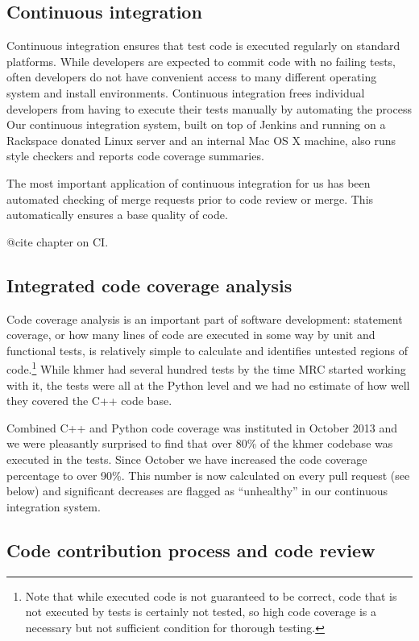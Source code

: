 \documentclass[11pt]{article}
\begin{document}
\subsection{Continuous integration}

Continuous integration ensures that test code is executed regularly on
standard platforms.  While developers are expected to commit code with
no failing tests, often developers do not have convenient access to
many different operating system and install environments.  Continuous
integration frees individual developers from having to execute their
tests manually by automating the process Our continuous integration
system, built on top of Jenkins and running on a Rackspace donated
Linux server and an internal Mac OS X machine, also runs style
checkers and reports code coverage summaries.

The most important application of continuous integration for us has been
automated checking of merge requests prior to code review or merge.  This
automatically ensures a base quality of code.

@cite chapter on CI.

\subsection{Integrated code coverage analysis}

Code coverage analysis is an important part of software development:
statement coverage, or how many lines of code are executed in some way
by unit and functional tests, is relatively simple to calculate and
identifies untested regions of code.\footnote{Note that while executed
  code is not guaranteed to be correct, code that is not executed by
  tests is certainly not tested, so high code coverage is a necessary
  but not sufficient condition for thorough testing.}  While khmer had
several hundred tests by the time MRC started working with it, the
tests were all at the Python level and we had no estimate of how well
they covered the C++ code base.

Combined C++ and Python code coverage was instituted in October 2013
and we were pleasantly surprised to find that over 80\% of the khmer
codebase was executed in the tests.  Since October we have increased
the code coverage percentage to over 90\%. This number is now
calculated on every pull request (see below) and significant decreases
are flagged as ``unhealthy'' in our continuous integration system.

\subsection{Code contribution process and code review}
\end{document}
